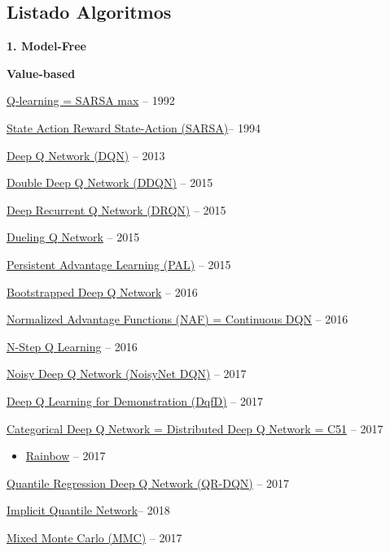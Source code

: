 \documentclass[
  a4paper,
  DIV=11,
  numbers=noendperiod]{scrreprt}
\providecommand{\tightlist}{%
  \setlength{\itemsep}{0pt}\setlength{\parskip}{0pt}}\usepackage{longtable,booktabs,array}
\begin{document}
\subsection{Listado Algoritmos}\label{listado-algoritmos}

\textbf{1. Model-Free}

\textbf{Value-based}

\href{https://link.springer.com/content/pdf/10.1007/BF00992698.pdf}{Q-learning
= SARSA max} -- 1992

\href{http://mi.eng.cam.ac.uk/reports/svr-ftp/auto-pdf/rummery_tr166.pdf}{State
Action Reward State-Action (SARSA)}-- 1994

\href{https://www.cs.toronto.edu/~vmnih/docs/dqn.pdf}{Deep Q Network
(DQN)} -- 2013

\href{https://arxiv.org/pdf/1509.06461.pdf}{Double Deep Q Network
(DDQN)} -- 2015

\href{https://arxiv.org/abs/1507.06527}{Deep Recurrent Q Network (DRQN)}
-- 2015

\href{https://arxiv.org/abs/1511.06581}{Dueling Q Network} -- 2015

\href{https://arxiv.org/abs/1512.04860}{Persistent Advantage Learning
(PAL)} -- 2015

\href{https://arxiv.org/abs/1602.04621}{Bootstrapped Deep Q Network} --
2016

\href{https://arxiv.org/abs/1603.00748}{Normalized Advantage Functions
(NAF) = Continuous DQN} -- 2016

\href{https://arxiv.org/abs/1602.01783}{N-Step Q Learning} -- 2016

\href{https://arxiv.org/abs/1706.10295}{Noisy Deep Q Network (NoisyNet
DQN)} -- 2017

\href{https://arxiv.org/abs/1704.03732}{Deep Q Learning for
Demonstration (DqfD)} -- 2017

\href{https://arxiv.org/abs/1707.06887}{Categorical Deep Q Network =
Distributed Deep Q Network = C51} -- 2017

\begin{itemize}
\tightlist
\item
  \href{https://arxiv.org/abs/1710.02298}{Rainbow} -- 2017
\end{itemize}

\href{https://arxiv.org/pdf/1710.10044v1.pdf}{Quantile Regression Deep Q
Network (QR-DQN)} -- 2017

\href{https://arxiv.org/abs/1806.06923}{Implicit Quantile Network}--
2018

\href{https://arxiv.org/abs/1703.01310}{Mixed Monte Carlo (MMC)} -- 2017
\end{document}
